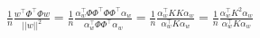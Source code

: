 \begin{Parts}
\begin{enumerate}
    \begin{solution}
    \begin{align*}
        \frac{1}{n} \frac{w^{\top}\Phi^{\top}\Phi{}w}{||w||^{2}} =
        \frac{1}{n}
    \frac{\alpha_{w}^{\top}\Phi\Phi^{\top}\Phi\Phi^{\top}\alpha_w}{\alpha_{w}^{\top}\Phi\Phi^{\top}\alpha_w} =
    \frac{1}{n} \frac{\alpha_{w}^{\top}KK\alpha_w}{\alpha_{w}^{\top}K\alpha_w} =
\frac{1}{n} \frac{\alpha_{w}^{\top}K^2\alpha_w}{\alpha_{w}^{\top}K\alpha_w}
    \end{align*}
\end{solution}
\end{enumerate}

\end{Parts}


